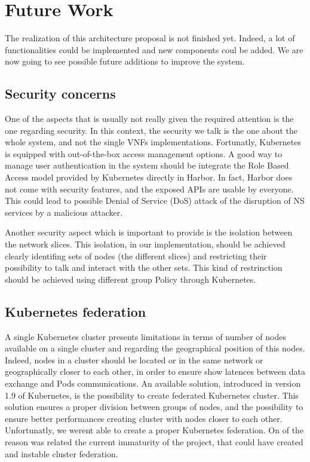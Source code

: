 \chapter{Future Work}
\label{chap:fw}

The realization of this architecture proposal is not finished yet. Indeed, a lot
of functionalities could be implemented and new components coul be added. We are
now going to see possible future additions to improve the system.

\section{Security concerns}

One of the aspects that is usually not really given the required attention is
the one regarding security. In this context, the security we talk is the one
about the whole system, and not the single VNFs implementations. Fortunatly,
Kubernetes is equipped with out-of-the-box access management options. A good way
to manage user authentication in the system should be integrate the Role Based
Access model provided by Kubernetes directly in Harbor. In fact, Harbor does not
come with security features, and the exposed APIs are usable by everyone. This
could lead to possible Denial of Service (DoS) attack of the disruption of NS
services by a malicious attacker.

Another security aspect which is important to provide is the isolation between
the network slices. This isolation, in our implementation, should be achieved
clearly identifing sets of nodes (the different slices) and restricting their
possibility to talk and interact with the other sets. This kind of restrinction
should be achieved using different group Policy through Kubernetes.

\section{Kubernetes federation}

A single Kubernetes cluster presents limitations in terms of number of nodes
available on a single cluster and regarding the geographical position of this
nodes. Indeed, nodes in a cluster should be located or in the same network or
geographically closer to each other, in order to ensure show latences between
data exchange and Pods communications. An available solution, introduced in
version 1.9 of Kubernetes, is the possibility to create federated Kubernetes
cluster. This solution ensures a proper division between groups of nodes, and
the possibility to ensure better performances creating cluster with nodes closer
to each other. Unfortunatly, we werent able to create a proper Kubernetes
federation. On of the reason was related the current immaturity of the project,
that could have created and instable cluster federation.

